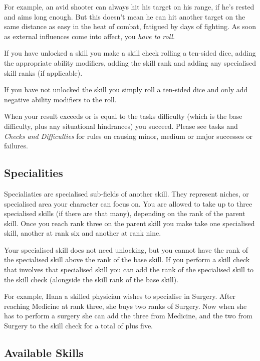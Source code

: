 For example, an avid shooter can always hit his target on his range, if he's
rested and aims long enough. But this doesn't mean he can hit another target
on the same distance as easy in the heat of combat, fatigued by days of
fighting. As soon as external influences come into affect, you \emph{have to
  roll}.

If you have unlocked a skill you make a skill check rolling a ten-sided dice,
adding the appropriate ability modifiers, adding the skill rank and adding any
specialised skill ranks (if applicable).

If you have not unlocked the skill you simply roll a ten-sided dice and only
add negative ability modifiers to the roll.

When your result exceeds or is equal to the tasks difficulty (which is the base
difficulty, plus any situational hindrances) you succeed. Please see tasks and
\emph{Checks and Difficulties} for rules on causing minor, medium or major
successes or failures.

\subsection{Specialities}

Specialiaties are specialised sub-fields of another skill. They represent
niches, or specialised area your character can focus on. You are allowed to
take up to three specialised skills (if there are that many), depending on
the rank of the parent skill. Once you reach rank three on the parent skill
you make take one specialised skill, another at rank six and another at rank
nine.

Your specialised skill does not need unlocking, but you cannot have the rank
of the specialised skill above the rank of the base skill. If you perform a
skill check that involves that specialised skill you can add the rank of the
specialised skill to the skill check (alongside the skill rank of the base
skill).

For example, Hana a skilled physician wishes to specialise in Surgery. After
reaching Medicine at rank three, she buys two ranks of Surgery. Now when she
has to perform a surgery she can add the three from Medicine, and the two from
Surgery to the skill check for a total of plus five.

\subsection{Available Skills}

